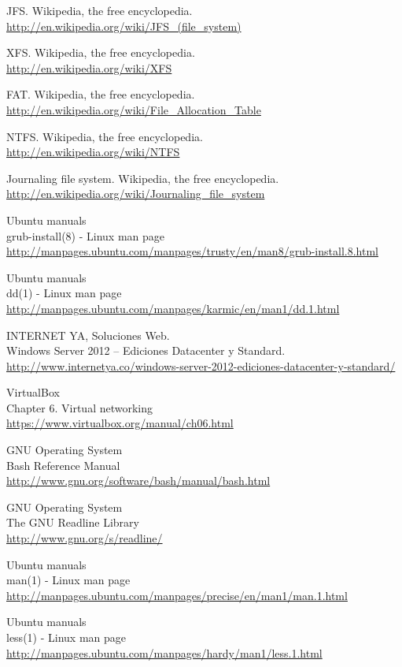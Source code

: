 \begin{thebibliography}{10}
JFS. Wikipedia, the free encyclopedia.\\
  \url{http://en.wikipedia.org/wiki/JFS_(file_system)}

XFS. Wikipedia, the free encyclopedia.\\
  \url{http://en.wikipedia.org/wiki/XFS}

FAT. Wikipedia, the free encyclopedia.\\
  \url{http://en.wikipedia.org/wiki/File_Allocation_Table}

NTFS. Wikipedia, the free encyclopedia.\\
  \url{http://en.wikipedia.org/wiki/NTFS}

Journaling file system. Wikipedia, the free encyclopedia.\\
  \url{http://en.wikipedia.org/wiki/Journaling_file_system}

Ubuntu manuals\\
grub-install(8) - Linux man page\\
  \url{http://manpages.ubuntu.com/manpages/trusty/en/man8/grub-install.8.html}

Ubuntu manuals\\
dd(1) - Linux man page\\
\url{http://manpages.ubuntu.com/manpages/karmic/en/man1/dd.1.html}

INTERNET YA, Soluciones Web.\\
Windows Server 2012 – Ediciones Datacenter y Standard.\\
  \url{http://www.internetya.co/windows-server-2012-ediciones-datacenter-y-standard/}

VirtualBox\\
Chapter 6. Virtual networking\\
\url{https://www.virtualbox.org/manual/ch06.html}

GNU Operating System\\
Bash Reference Manual\\
\url{http://www.gnu.org/software/bash/manual/bash.html}

GNU Operating System\\
The GNU Readline Library\\
\url{http://www.gnu.org/s/readline/}

Ubuntu manuals\\
man(1) - Linux man page\\
\url{http://manpages.ubuntu.com/manpages/precise/en/man1/man.1.html}

Ubuntu manuals\\
less(1) - Linux man page\\
\url{http://manpages.ubuntu.com/manpages/hardy/man1/less.1.html}

\end{thebibliography}

